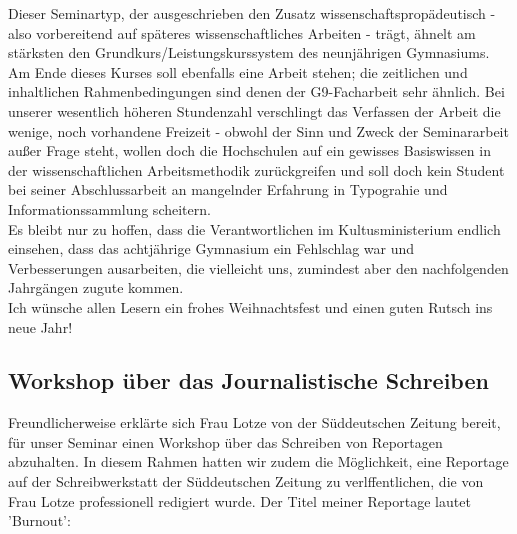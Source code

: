 \documentclass[a4paper,12pt,twoside]{scrbook}
\begin{document}
Dieser Seminartyp, der ausgeschrieben den Zusatz wissenschaftspropädeutisch - also vorbereitend auf späteres wissenschaftliches Arbeiten - trägt, ähnelt am stärksten den Grundkurs/Leistungskurssystem des neunjährigen Gymnasiums. Am Ende dieses Kurses soll ebenfalls eine Arbeit stehen; die zeitlichen und inhaltlichen Rahmenbedingungen sind denen der G9-Facharbeit sehr ähnlich. Bei unserer wesentlich höheren Stundenzahl verschlingt das Verfassen der Arbeit die wenige, noch vorhandene Freizeit - obwohl der Sinn und Zweck der Seminararbeit außer Frage steht, wollen doch die Hochschulen auf ein gewisses Basiswissen in der wissenschaftlichen Arbeitsmethodik zurückgreifen und soll doch kein Student bei seiner Abschlussarbeit an mangelnder Erfahrung in Typograhie und Informationssammlung scheitern.
\\
Es bleibt nur zu hoffen, dass die Verantwortlichen im Kultusministerium endlich einsehen, dass das achtjährige Gymnasium ein Fehlschlag war und Verbesserungen ausarbeiten, die vielleicht uns, zumindest aber den nachfolgenden Jahrgängen zugute kommen.
\\
Ich wünsche allen Lesern ein frohes Weihnachtsfest und einen guten Rutsch ins neue Jahr!
\subsection{Workshop über das Journalistische Schreiben}
Freundlicherweise erklärte sich Frau Lotze von der Süddeutschen Zeitung bereit, für unser Seminar einen Workshop über das Schreiben von Reportagen abzuhalten.
In diesem Rahmen hatten wir zudem die Möglichkeit, eine Reportage auf der Schreibwerkstatt der Süddeutschen Zeitung zu verlffentlichen, die von Frau Lotze professionell redigiert wurde.
Der Titel meiner Reportage lautet 'Burnout':
\end{document}
